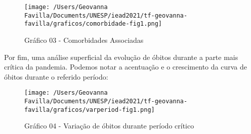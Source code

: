 \documentclass[
]{article}
\begin{document}
\begin{figure}
\centering
\texttt{[image: /Users/Geovanna Favilla/Documents/UNESP/iead2021/tf-geovanna-favilla/graficos/comorbidade-fig1.png]}
\caption{Gráfico 03 - Comorbidades Associadas}
\end{figure}

Por fim, uma análise superficial da evolução de óbitos durante a parte
mais crítica da pandemia. Podemos notar a acentuação e o crescimento da
curva de óbitos durante o referido período:

\begin{figure}
\centering
\texttt{[image: /Users/Geovanna Favilla/Documents/UNESP/iead2021/tf-geovanna-favilla/graficos/varperiod-fig1.png]}
\caption{Gráfico 04 - Variação de óbitos durante período crítico}
\end{figure}
\end{document}
